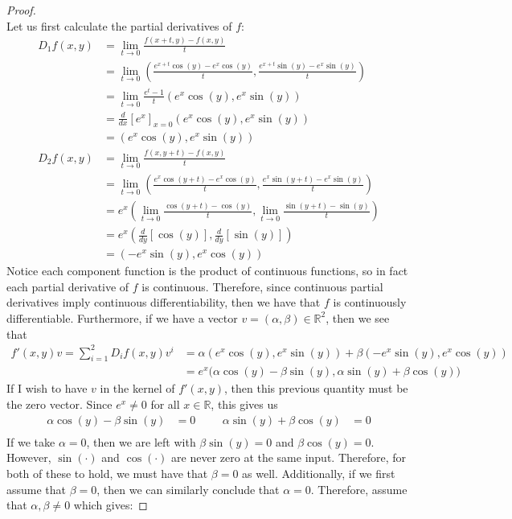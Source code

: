 \documentclass[10pt,a4paper]{article}
\theoremstyle{definition}
\theoremstyle{definition}
\numberwithin{equation}{section}
\begin{document}
\begin{proof}$ $
\\Let us first calculate the partial derivatives of $f$: 
\begin{align*}
D_1 f(x, y) &= \lim_{t \to 0} \frac{f(x + t, y) - f(x, y)}{t}\\
&= \lim_{t \to 0} \left( \frac{e^{x + t} \cos(y) - e^x \cos(y)}{t}, \frac{e^{x + t} \sin(y) - e^x \sin(y)}{t}\right)\\
&= \lim_{t \to 0} \frac{e^t - 1}{t} (e^x \cos(y), e^x \sin(y))\\
&= \frac{d}{dx}[e^x]_{x = 0} (e^x \cos(y), e^x \sin(y))\\
&= (e^x \cos(y), e^x \sin(y))\\
D_2 f(x, y) &= \lim_{t \to 0} \frac{f(x, y + t) - f(x, y)}{t}\\
&= \lim_{t \to 0} \left( \frac{e^x \cos(y + t) - e^x \cos(y)}{t}, \frac{e^x \sin(y + t) - e^x \sin(y)}{t}\right)\\
&= e^x \left( \lim_{t \to 0} \frac{\cos(y + t) - \cos(y)}{t}, \lim_{t \to 0} \frac{\sin(y + t) - \sin(y)}{t}\right)\\
&= e^x \left( \frac{d}{dy}[\cos(y)], \frac{d}{dy}[\sin(y)] \right)\\
&= (-e^x \sin(y), e^x \cos(y))
\end{align*}
Notice each component function is the product of continuous functions, so in fact each partial derivative of $f$ is continuous. Therefore, since continuous partial derivatives imply continuous differentiability, then we have that $f$ is continuously differentiable. Furthermore, if we have a vector $v = (\alpha, \beta) \in \mathbb{R}^2$, then we see that 
\begin{align*}
f'(x, y)v = \sum_{i = 1}^2 D_i f(x, y) v^i &= \alpha (e^x \cos(y), e^x \sin(y)) + \beta (-e^x \sin(y), e^x \cos(y))\\
&= e^x \bigg(\alpha\cos(y) - \beta \sin(y), \alpha \sin(y) + \beta\cos(y) \bigg)
\end{align*}
If I wish to have $v$ in the kernel of $f'(x, y)$, then this previous quantity must be the zero vector. Since $e^x \neq 0$ for all $x \in \mathbb{R}$, this gives us
\begin{align*}
\alpha\cos(y) - \beta \sin(y) &= 0 &&& \alpha \sin(y) + \beta\cos(y) &= 0\\ 
\end{align*}
If we take $\alpha = 0$, then we are left with $\beta\sin(y) = 0$ and $\beta \cos(y) = 0$. However, $\sin(\cdot)$ and $\cos(\cdot)$ are never zero at the same input. Therefore, for both of these to hold, we must have that $\beta = 0$ as well. Additionally, if we first assume that $\beta = 0$, then we can similarly conclude that $\alpha = 0$. Therefore, assume that $\alpha, \beta \neq 0$ which gives:

\end{proof}
\end{document}
